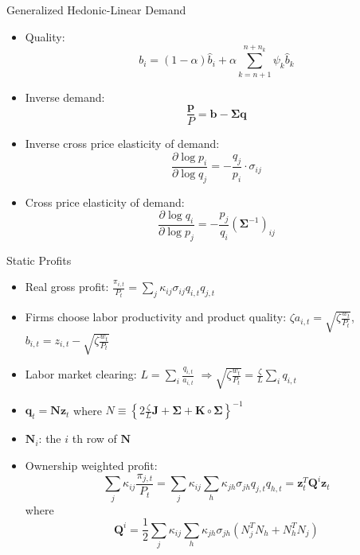 \documentclass[
  aspectratio=169,  %
  handout           %
]{beamer}
\theoremstyle{plain}
\begin{document}
\begin{frame}{Generalized Hedonic-Linear Demand \citep{Pellegrino2024-dn}}
  \begin{itemize}
    \item Quality:
          \[
            b_{i}=\left(1-\alpha\right)\hat{b}_{i}+\alpha\sum_{k=n+1}^{n+n_{k}}\psi_{k}\hat{b}_{k}
          \]
    \item Inverse demand:
          \[
            \frac{\symbf{p}}{P}=\symbf{b}-\symbf{\Sigma}\symbf{q}
          \]
    \item Inverse cross price elasticity of demand:
          \[
            \frac{\partial\log p_{i}}{\partial\log q_{j}}=-\frac{q_{j}}{p_{i}}\cdot\sigma_{ij}
          \]
    \item Cross price elasticity of demand:
          \[
            \frac{\partial\log q_{i}}{\partial\log p_{j}}=-\frac{p_{j}}{q_{i}}(\symbf{\Sigma}^{-1})_{ij}
          \]
  \end{itemize}
\end{frame}
%
\begin{frame}{Static Profits}
  \begin{itemize}
    \item \label{Q}Real gross profit: $\frac{\pi_{i,t}}{P_{t}}=\sum_{j}\kappa_{ij}\sigma_{ij}q_{i,t}q_{j,t}$
    \item Firms choose labor productivity and product quality: $\zeta a_{i,t}=\sqrt{\zeta\frac{w_{t}}{P_{t}}}$,
          $b_{i,t}=z_{i,t}-\sqrt{\zeta\frac{w_{t}}{P_{t}}}$
    \item Labor market clearing: $L=\sum_{i}\frac{q_{i,t}}{a_{i,t}}$ $\Longrightarrow$$\sqrt{\zeta\frac{w_{t}}{P_{t}}}=\frac{\zeta}{L}\sum_{i}q_{i,t}$
    \item $\symbf{q}_{t}=\symbf{N}\symbf{z}_{t}$ where $N\equiv\left\{ 2\frac{\zeta}{L}\symbf{J}+\symbf{\Sigma}+\symbf{K}\circ\symbf{\Sigma}\right\} ^{-1}$
    \item $\symbf{N}_{i}$: the $i$ th row of $\symbf{N}$
    \item Ownership weighted profit:
          {\small
          \[
            \sum_{j}\kappa_{ij}\frac{\pi_{j,t}}{P_{t}}=\sum_{j}\kappa_{ij}\sum_{h}\kappa_{jh}\sigma_{jh}q_{j,t}q_{h,t}=\symbf{z}_{t}^{T}\symbf{Q}^{i}\symbf{z}_{t}
          \]}
          where
          {\small
          \[
            \symbf{Q}^{i}=\frac{1}{2}\sum_{j}\kappa_{ij}\sum_{h}\kappa_{jh}\sigma_{jh}\left(N_{j}^{T}N_{h}+N_{h}^{T}N_{j}\right)
          \]
          }
          \hyperlink{cournot}{}
  \end{itemize}
\end{frame}
\end{document}
